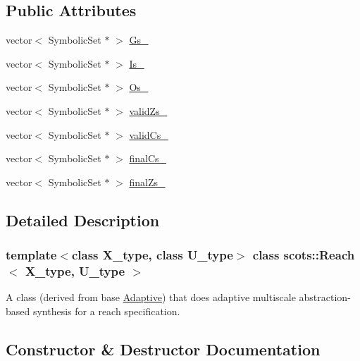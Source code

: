 \subsection*{Public Attributes}
\begin{DoxyCompactItemize}
\item 
vector$<$ Symbolic\+Set $\ast$ $>$ \hyperlink{classscots_1_1Reach_af3fd5ddf192d97ec5dc650ad57e6c485}{Gs\+\_\+}
\item 
vector$<$ Symbolic\+Set $\ast$ $>$ \hyperlink{classscots_1_1Reach_a3366767e4a2edbb8c683e0a74a709b10}{Is\+\_\+}
\item 
vector$<$ Symbolic\+Set $\ast$ $>$ \hyperlink{classscots_1_1Reach_aaf92fe46eb13b4939c4bf350102135ce}{Os\+\_\+}
\item 
vector$<$ Symbolic\+Set $\ast$ $>$ \hyperlink{classscots_1_1Reach_a2f484ac1e7bd5a451b409c373149369c}{valid\+Zs\+\_\+}
\item 
vector$<$ Symbolic\+Set $\ast$ $>$ \hyperlink{classscots_1_1Reach_ade8c2425a8ff0cc7d7ed017412b6aa29}{valid\+Cs\+\_\+}
\item 
vector$<$ Symbolic\+Set $\ast$ $>$ \hyperlink{classscots_1_1Reach_a42e41806d2c3308e41de9b21afae2206}{final\+Cs\+\_\+}
\item 
vector$<$ Symbolic\+Set $\ast$ $>$ \hyperlink{classscots_1_1Reach_ae607710b3da219ec741f8609f870bafd}{final\+Zs\+\_\+}
\end{DoxyCompactItemize}


\subsection{Detailed Description}
\subsubsection*{template$<$class X\+\_\+type, class U\+\_\+type$>$\newline
class scots\+::\+Reach$<$ X\+\_\+type, U\+\_\+type $>$}

A class (derived from base \hyperlink{classscots_1_1Adaptive}{Adaptive}) that does adaptive multiscale abstraction-\/based synthesis for a reach specification. 

\subsection{Constructor \& Destructor Documentation}
\mbox{\label{classscots_1_1Reach_ac61b7e746e55013c48de47eb3dc00ff7}} 

